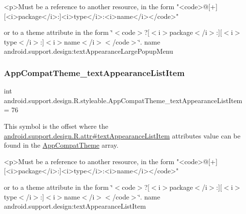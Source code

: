 \begin{DoxyVerb}      <p>Must be a reference to another resource, in the form "<code>@[+][<i>package</i>:]<i>type</i>:<i>name</i></code>"
\end{DoxyVerb}
 or to a theme attribute in the form \char`\"{}$<$code$>$?\mbox{[}$<$i$>$package$<$/i$>$\+:\mbox{]}\mbox{[}$<$i$>$type$<$/i$>$\+:\mbox{]}$<$i$>$name$<$/i$>$$<$/code$>$\char`\"{}.  name android.\+support.\+design\+:text\+Appearance\+Large\+Popup\+Menu \mbox{\label{classandroid_1_1support_1_1design_1_1R_1_1styleable_af9613bb433f8ea578ca10997d7f31384}} 
\subsubsection{\texorpdfstring{App\+Compat\+Theme\+\_\+text\+Appearance\+List\+Item}{AppCompatTheme\_textAppearanceListItem}}
{\footnotesize\ttfamily int android.\+support.\+design.\+R.\+styleable.\+App\+Compat\+Theme\+\_\+text\+Appearance\+List\+Item = 76\hspace{0.3cm}{\ttfamily [static]}}

This symbol is the offset where the \hyperlink{classandroid_1_1support_1_1design_1_1R_1_1attr_a8003ce7a3a860259e7e2b8dafba8d40f}{android.\+support.\+design.\+R.\+attr\#text\+Appearance\+List\+Item} attribute\textquotesingle{}s value can be found in the \hyperlink{classandroid_1_1support_1_1design_1_1R_1_1styleable_afb351dc8de20cbd4c89abe360373010c}{App\+Compat\+Theme} array.

\begin{DoxyVerb}      <p>Must be a reference to another resource, in the form "<code>@[+][<i>package</i>:]<i>type</i>:<i>name</i></code>"
\end{DoxyVerb}
 or to a theme attribute in the form \char`\"{}$<$code$>$?\mbox{[}$<$i$>$package$<$/i$>$\+:\mbox{]}\mbox{[}$<$i$>$type$<$/i$>$\+:\mbox{]}$<$i$>$name$<$/i$>$$<$/code$>$\char`\"{}.  name android.\+support.\+design\+:text\+Appearance\+List\+Item \mbox{\label{classandroid_1_1support_1_1design_1_1R_1_1styleable_abc32a69cec9cd2518cfcbb996cbd9b21}} 
